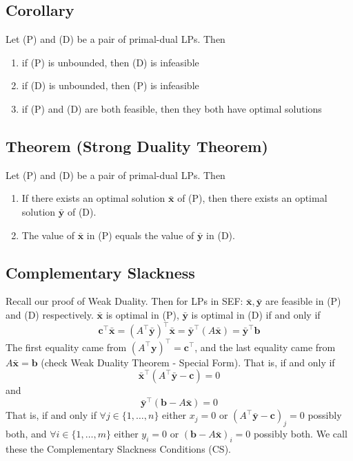 \begin{thmbox}
    \subsection{Corollary}
    Let (P) and (D) be a pair of primal-dual LPs. Then
    \begin{enumerate}[(1)]
        \item if (P) is unbounded, then (D) is infeasible
        \item if (D) is unbounded, then (P) is infeasible
        \item if (P) and (D) are both feasible, then they both
        have optimal solutions
    \end{enumerate}
\end{thmbox}

\begin{thmbox}
    \subsection{Theorem (Strong Duality Theorem)}
    Let (P) and (D) be a pair of primal-dual LPs. Then
    \begin{enumerate}[(1)]
        \item If there exists an optimal solution $ \bm{\bar{x}} $ of (P), then there exists an optimal solution $ \bm{\bar{y}} $ of (D).
        \item The value of $ \bm{\bar{x}} $ in (P) equals the value of $ \bm{\bar{y}} $ in (D).
    \end{enumerate}
\end{thmbox}

\subsection{Complementary Slackness}
Recall our proof of Weak Duality. Then for LPs in SEF: 
$ \bm{\bar{x}}, \bm{\bar{y}} $ are feasible in (P) and (D) respectively.
$ \bm{\bar{x}} $ is optimal in (P), $ \bm{\bar{y}} $ is optimal in
(D)  if and only if
\[ \bm{c} ^\top \bm{\bar{x}}=(A^\top \bm{\bar{y}})^\top \bm{\bar{x}}=\bm{\bar{y}}^\top(A \bm{\bar{x}})=
\bm{\bar{y}}^\top \bm{b} \]
The first equality came from $ (A ^\top \bm{y})^\top=\bm{c}^\top $, and the
last equality came from $ A \bm{\bar{x}}=\bm{b} $ (check Weak Duality Theorem -
Special Form).
That is, if and only if
\[ \bm{\bar{x}}^\top(A ^\top \bm{\bar{y}}-\bm{c})=0 \]
and
\[ \bm{\bar{y}}^\top(\bm{b}-A \bm{\bar{x}})=0 \]
That is, if and only if $ \forall j\in \{1,\ldots,n\} $ either
$ x_j=0 $ or $ (A ^\top \bm{\bar{y}}-\bm{c})_j=0 $ possibly
both, and $ \forall i\in \{1,\ldots,m\} $ either $ y_i=0 $
or $ (\bm{b}-A \bm{\bar{x}})_i=0 $ possibly both. We call these
the Complementary Slackness Conditions (CS).

